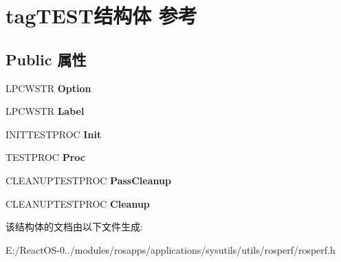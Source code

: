 \hypertarget{structtag_t_e_s_t}{}\section{tag\+T\+E\+S\+T结构体 参考}
\label{structtag_t_e_s_t}
\subsection*{Public 属性}
\begin{DoxyCompactItemize}
\item 
\mbox{\label{structtag_t_e_s_t_a7897d6806df4b3bbb33ff9bd5ca30e97}} 
L\+P\+C\+W\+S\+TR {\bfseries Option}
\item 
\mbox{\label{structtag_t_e_s_t_a525af36aa54ab067c49e2b47c0a2a2dc}} 
L\+P\+C\+W\+S\+TR {\bfseries Label}
\item 
\mbox{\label{structtag_t_e_s_t_ab2f36831b4e879653f0668b0e417d460}} 
I\+N\+I\+T\+T\+E\+S\+T\+P\+R\+OC {\bfseries Init}
\item 
\mbox{\label{structtag_t_e_s_t_a75879485f95979f55ea5c22d35cd684b}} 
T\+E\+S\+T\+P\+R\+OC {\bfseries Proc}
\item 
\mbox{\label{structtag_t_e_s_t_a2ea6d2d3f79f1dfc3bea0093787d2d42}} 
C\+L\+E\+A\+N\+U\+P\+T\+E\+S\+T\+P\+R\+OC {\bfseries Pass\+Cleanup}
\item 
\mbox{\label{structtag_t_e_s_t_aabf285d744e4988313953635b7446e20}} 
C\+L\+E\+A\+N\+U\+P\+T\+E\+S\+T\+P\+R\+OC {\bfseries Cleanup}
\end{DoxyCompactItemize}


该结构体的文档由以下文件生成\+:\begin{DoxyCompactItemize}
\item 
E\+:/\+React\+O\+S-\/0../modules/rosapps/applications/sysutils/utils/rosperf/rosperf.\+h\end{DoxyCompactItemize}
